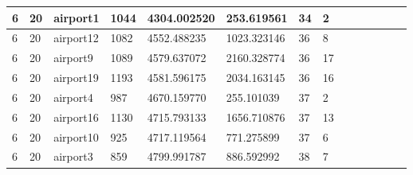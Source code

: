 \documentclass[../thesis.tex]{subfiles}
\begin{document}
\begin{table}[!ht]
\begin{tabularx}{\textwidth}{|X|X|X|X|X|X|X|X|X|X|X|X|X|X|}
        6 & 20 & airport1 & 1044 & 4304.002520 & 253.619561 & 34 & 2 \\ \hline
        6 & 20 & airport12 & 1082 & 4552.488235 & 1023.323146 & 36 & 8 \\ \hline
        6 & 20 & airport9 & 1089 & 4579.637072 & 2160.328774 & 36 & 17 \\ \hline
        6 & 20 & airport19 & 1193 & 4581.596175 & 2034.163145 & 36 & 16 \\ \hline
        6 & 20 & airport4 & 987 & 4670.159770 & 255.101039 & 37 & 2 \\ \hline
        6 & 20 & airport16 & 1130 & 4715.793133 & 1656.710876 & 37 & 13 \\ \hline
        6 & 20 & airport10 & 925 & 4717.119564 & 771.275899 & 37 & 6 \\ \hline
        6 & 20 & airport3 & 859 & 4799.991787 & 886.592992 & 38 & 7 \\ \hline
    \end{tabularx}
\end{table}
\end{document}
